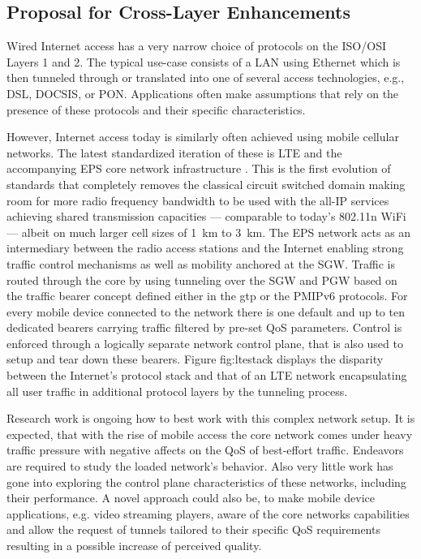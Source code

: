 \subsection{Proposal for Cross-Layer Enhancements}
\label{c5:crosslayerhinting}


Wired Internet access has a very narrow choice of protocols on the \gls{ISO}/\gls{OSI} Layers 1 and 2. The typical use-case consists of a \gls{LAN} using Ethernet which is then tunneled through or translated into one of several access technologies, e.g., \gls{DSL}, \gls{DOCSIS}, or \gls{PON}. Applications often make assumptions that rely on the presence of these protocols and their specific characteristics.

However, Internet access today is similarly often achieved using mobile cellular networks. The latest standardized iteration of these is \gls{LTE} and the accompanying \gls{EPS} core network infrastructure \cite{olsson2009sae}. This is the first evolution of standards that completely removes the classical circuit switched domain making room for more radio frequency bandwidth to be used with the all-\gls{IP} services achieving shared transmission capacities --- comparable to today's 802.11n WiFi --- albeit on much larger cell sizes of \SI{1}{\kilo\meter} to \SI{3}{\kilo\meter}. The \gls{EPS} network acts as an intermediary between the radio access stations and the Internet enabling strong traffic control mechanisms as well as mobility anchored at the \gls{SGW}. Traffic is routed through the core by using tunneling over the \gls{SGW} and \gls{PGW} based on the traffic bearer concept defined either in the \gls{gtp} or the \gls{PMIPv6} protocols. For every mobile device connected to the network there is one default and up to ten dedicated bearers carrying traffic filtered by pre-set \gls{QoS} parameters. Control is enforced through a logically separate network control plane, that is also used to setup and tear down these bearers. Figure fig:ltestack displays the disparity between the Internet's protocol stack and that of an \gls{LTE} network encapsulating all user traffic in additional protocol layers by the tunneling process.

Research work is ongoing how to best work with this complex network setup. It is expected, that with the rise of mobile access the core network comes under heavy traffic pressure with negative affects on the \gls{QoS} of best-effort traffic. Endeavors are required to study the loaded network's behavior. Also very little work has gone into exploring the control plane characteristics of these networks, including their performance. A novel approach could also be, to make mobile device applications, e.g. video streaming players, aware of the core networks capabilities and allow the request of tunnels tailored to their specific \gls{QoS} requirements resulting in a possible increase of perceived quality.

